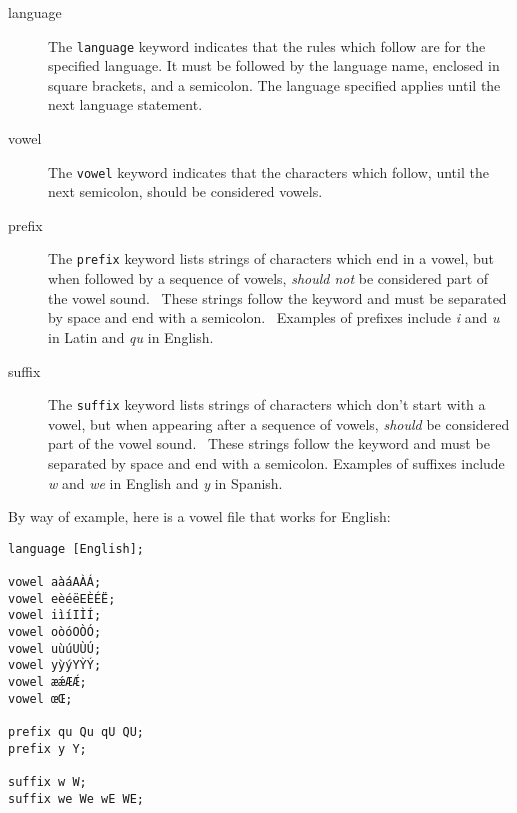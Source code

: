 \begin{description}

\item[language]

The \texttt{language} keyword indicates that the rules which follow are
for the specified language.  It must be followed by the language name,
enclosed in square brackets, and a semicolon.  The language specified
applies until the next language statement.

\item[vowel]

The \texttt{vowel} keyword indicates that the characters which follow,
until the next semicolon, should be considered vowels.

\item[prefix]

The \texttt{prefix} keyword lists strings of characters which end in a
vowel, but when followed by a sequence of vowels, \emph{should not} be
considered part of the vowel sound.  These strings follow the keyword
and must be separated by space and end with a semicolon.  Examples of
prefixes include \emph{i} and \emph{u} in Latin and \emph{qu} in
English.

\item[suffix]

The \texttt{suffix} keyword lists strings of characters which don't
start with a vowel, but when appearing after a sequence of vowels,
\emph{should} be considered part of the vowel sound.  These strings
follow the keyword and must be separated by space and end with a
semicolon.  Examples of suffixes include \emph{w} and \emph{we} in
English and \emph{y} in Spanish.

\end{description}

By way of example, here is a vowel file that works for English:

\begin{lstlisting}
language [English];

vowel aàáAÀÁ;
vowel eèéëEÈÉË;
vowel iìíIÌÍ;
vowel oòóOÒÓ;
vowel uùúUÙÚ;
vowel yỳýYỲÝ;
vowel æǽÆǼ;
vowel œŒ;

prefix qu Qu qU QU;
prefix y Y;

suffix w W;
suffix we We wE WE;
\end{lstlisting}
